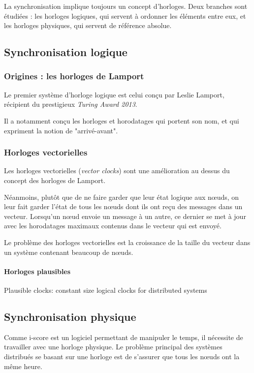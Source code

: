 La synchronisation implique toujours un concept d'horloges. Deux branches sont étudiées : les horloges logiques, qui servent à ordonner les éléments entre eux, et les horloges physiques, qui servent de référence absolue.

\subsection{Synchronisation logique}
\subsubsection{Origines : les horloges de Lamport}
Le premier système d'horloge logique est celui conçu par Leslie Lamport, récipient du prestigieux \textit{Turing Award 2013}.

Il a notamment conçu les horloges et horodatages qui portent son nom, et qui expriment la notion de "arrivé-avant".
\subsubsection{Horloges vectorielles}
Les horloges vectorielles (\textit{vector clocks}) sont une amélioration au dessus du concept des horloges de Lamport.

Néanmoins, plutôt que de ne faire garder que leur état logique aux nœuds, on leur fait garder l'état de tous les nœuds dont ils ont reçu des messages dans un vecteur. Lorsqu'un nœud envoie un message à un autre, ce dernier se met à jour avec les horodatages maximaux contenus dans le vecteur qui est envoyé.

Le problème des horloges vectorielles est la croissance de la taille du vecteur dans un système contenant beaucoup de nœuds.

\paragraph{Horloges plausibles}
Plausible clocks: constant size logical clocks for distributed systems

\subsection{Synchronisation physique}
Comme i-score est un logiciel permettant de manipuler le temps, il nécessite de travailler avec une horloge physique. Le problème principal des systèmes distribués se basant sur une horloge est de s'assurer que tous les nœuds ont la même heure.

